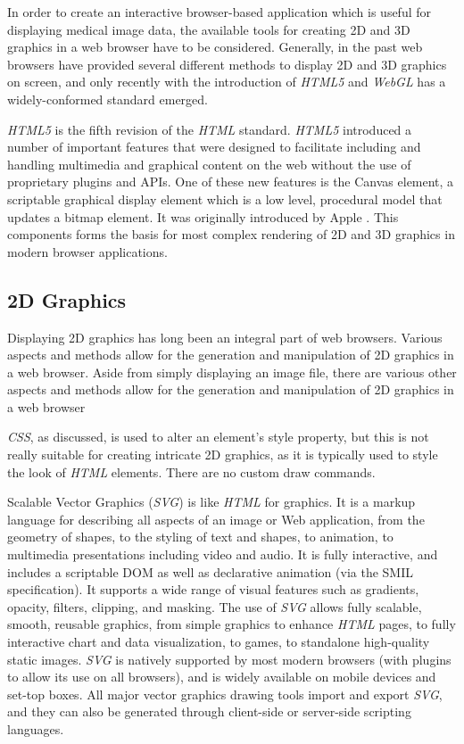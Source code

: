 \documentclass[a4paper,11pt,twoside]{article}
\begin{document}
In order to create an interactive browser-based application which is useful for displaying medical image data, the available tools for creating 2D and 3D graphics in a web browser have to be considered. Generally, in the past web browsers have provided several different methods to display 2D and 3D graphics on screen, and only recently with the introduction of \textit{HTML5} and \textit{WebGL} has a widely-conformed standard emerged.

\textit{HTML5} is the fifth revision of the \textit{HTML} standard. \textit{HTML5} introduced a number of important features that were designed to facilitate including and handling multimedia and graphical content on the web without the use of proprietary plugins and APIs. One of these new features is the Canvas element, a scriptable graphical display element which is a low level, procedural model that updates a bitmap element. It was originally introduced by Apple \cite{canvas} . This components forms the basis for most complex rendering of 2D and 3D graphics in modern browser applications.

\subsection{2D Graphics}

Displaying 2D graphics has long been an integral part of web browsers. Various aspects and methods allow for the generation and manipulation of 2D graphics in a web browser. Aside from simply displaying an image file, there are various other aspects and methods allow for the generation and manipulation of 2D graphics in a web browser

\textit{CSS}, as discussed, is used to alter an element's style property, but this is not really suitable for creating intricate 2D graphics, as it is typically used to style the look of \textit{HTML} elements. There are no custom draw commands.

Scalable Vector Graphics (\textit{SVG}) is like \textit{HTML} for graphics\cite{svg}. It is a markup language for describing all aspects of an image or Web application, from the geometry of shapes, to the styling of text and shapes, to animation, to multimedia presentations including video and audio. It is fully interactive, and includes a scriptable DOM as well as declarative animation (via the SMIL specification). It supports a wide range of visual features such as gradients, opacity, filters, clipping, and masking.
The use of \textit{SVG} allows fully scalable, smooth, reusable graphics, from simple graphics to enhance \textit{HTML} pages, to fully interactive chart and data visualization, to games, to standalone high-quality static images. \textit{SVG} is natively supported by most modern browsers (with plugins to allow its use on all browsers), and is widely available on mobile devices and set-top boxes. All major vector graphics drawing tools import and export \textit{SVG}, and they can also be generated through client-side or server-side scripting languages.
\end{document}
